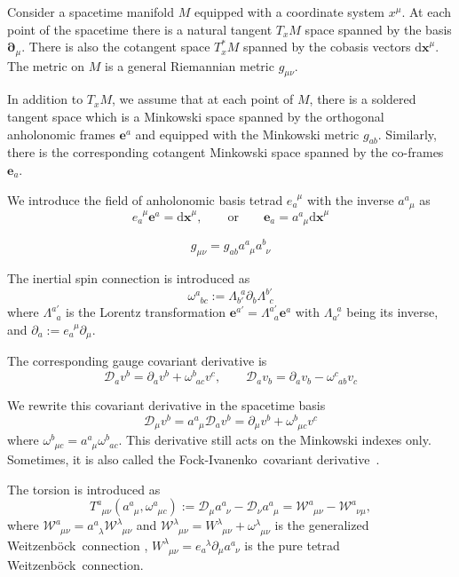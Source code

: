 \documentclass[
10pt, %
a4paper, %
oneside, %
headinclude,footinclude, %
BCOR5mm, %
]{scrartcl}
\newcommand{\xx}{\mathbf{x}}
\newcommand{\dx}{\mathrm{d}\xx}
\newcommand{\pd}{\partial}
\newcommand{\itetr}[2]{e^{\phantom{#2}#1}_{#2}}
\newcommand{\tetr}[2]{a^{#1}_{\phantom{#1}#2}}
\newcommand{\spin}[2]{\omega^{#1}_{\phantom{#1}#2}}
\newcommand{\Lor}[2]{\Lambda^{#1'}_{\phantom{#1}#2}}
\newcommand{\iLor}[2]{\Lambda^{\phantom{#2}#1}_{#2'}}
\newcommand{\D}[1]{\mathcal{D}_{#1}} %
\newcommand{\Tors}[2]{T^{#1}_{\phantom{a}#2}}
\newcommand{\W}[2]{\mathcal{W}^{#1}_{\phantom{#1}#2}}
\newcommand{\w}[2]{W^{#1}_{\phantom{#1}#2}}
\newcommand{\FI}{Fock-Ivanenko}
\newcommand{\We}{Weitzenb\"ock}
\begin{document}
Consider a spacetime manifold $ M $ equipped with a coordinate system $ x^\mu $. At each point of 
the spacetime there is a natural tangent $ T_{x}M $ space spanned by the basis $ \bm{\pd}_\mu $. 
There is also the cotangent space $ T_x^*M $ spanned by the cobasis vectors $ \bm{\dx}^\mu $.
The metric on $ M $ is a general Riemannian metric $ g_{\mu\nu} $.

In addition to $ T_{x}M $, we assume that at each point of $ M $, there is a soldered tangent space 
which is a Minkowski space spanned by the orthogonal anholonomic 
frames $ \bm{e}^a $ and equipped with the Minkowski metric $ g_{ab} $. Similarly, there is the 
corresponding cotangent Minkowski space spanned by the co-frames $ \bm{e}_a $. 

We introduce the field of anholonomic basis tetrad $ \itetr{\mu}{a} $ with the inverse $ 
\tetr{a}{\mu} $ as
\begin{equation}
\itetr{\mu}{a} \bm{e}^a = \bm{\dx}^\mu, \qquad \text{or} \qquad \bm{e}_a = \tetr{a}{\mu}\bm{\dx}^\mu
\end{equation}


\begin{equation}
g_{\mu\nu} = g_{ab} \tetr{a}{\mu}\tetr{b}{\nu}
\end{equation}


The inertial spin connection is introduced as
\begin{equation}
\spin{a}{bc} := \iLor{a}{b}\pd_b\Lor{b}{c}
\end{equation}
where $ \Lor{a}{a} $ is the Lorentz transformation $ \bm{e}^{a'} = \Lor{a}{a} \bm{e}^a $ with $ 
\iLor{a}{a} $ being its inverse, and $ \pd_a := \itetr{\mu}{a} \pd_\mu $.

The corresponding gauge covariant derivative is 
\begin{equation}
\D{a} v^b = \pd_a v^b + \spin{b}{ac} v^c, \qquad \D{a} v_b = \pd_a v_b - \spin{c}{ab} v_c
\end{equation}

We rewrite this covariant derivative in the spacetime basis
\begin{equation}
\D{\mu} v^b = \tetr{a}{\mu} \D{a} v^b = \pd_\mu v^b + \spin{b}{\mu c} v^c
\end{equation}
where $ \spin{b}{\mu c} = \tetr{a}{\mu}\spin{b}{ac} $.
This derivative still acts on the Minkowski indexes only. Sometimes, it is also called the \FI\ 
covariant derivative~\cite{AldrovandiPereiraBook}.

The torsion is introduced as
\begin{equation}
\Tors{a}{\mu\nu}(\tetr{a}{\mu},\spin{a}{\mu c}):=\D{\mu}\tetr{a}{\nu} - \D{\nu}\tetr{a}{\mu} = 
\W{a}{\mu\nu} - \W{a}{\nu\mu},
\end{equation}
where $ \W{a}{\mu\nu} = \tetr{a}{\lambda}\W{\lambda}{\mu\nu}$ and $ \W{\lambda}{\mu\nu} = 
\w{\lambda}{\mu\nu} + \spin{\lambda}{\mu\nu}$ is the 
generalized \We\ connection \cite{AldrovandiPereiraBook}, $ \w{\lambda}{\mu\nu} = 
\itetr{\lambda}{a}\pd_\mu \tetr{a}{\nu}$ is 
the pure tetrad \We\ connection.
\end{document}
